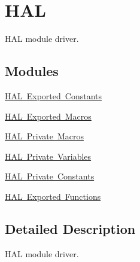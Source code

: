 \hypertarget{group___h_a_l}{}\section{H\+AL}
\label{group___h_a_l}


H\+AL module driver.  


\subsection*{Modules}
\begin{DoxyCompactItemize}
\item 
\mbox{\hyperlink{group___h_a_l___exported___constants}{H\+A\+L Exported Constants}}
\item 
\mbox{\hyperlink{group___h_a_l___exported___macros}{H\+A\+L Exported Macros}}
\item 
\mbox{\hyperlink{group___h_a_l___private___macros}{H\+A\+L Private Macros}}
\item 
\mbox{\hyperlink{group___h_a_l___private___variables}{H\+A\+L Private Variables}}
\item 
\mbox{\hyperlink{group___h_a_l___private___constants}{H\+A\+L Private Constants}}
\item 
\mbox{\hyperlink{group___h_a_l___exported___functions}{H\+A\+L Exported Functions}}
\end{DoxyCompactItemize}


\subsection{Detailed Description}
H\+AL module driver. 

